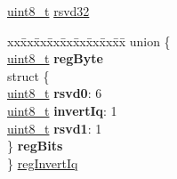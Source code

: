 \begin{DoxyCompactItemize}
\begin{tabbing}
\end{tabbing}\item 
\hyperlink{vl53l0x__types_8h_aba7bc1797add20fe3efdf37ced1182c5}{uint8\+\_\+t} \hyperlink{structFSK__Register__Map_a2afb62dfcde2ff0b44bd883947289d33}{rsvd32}
\item 
\begin{tabbing}
xx\=xx\=xx\=xx\=xx\=xx\=xx\=xx\=xx\=\kill
union \{\\
\>\hyperlink{vl53l0x__types_8h_aba7bc1797add20fe3efdf37ced1182c5}{uint8\_t} {\bfseries regByte}\\
\>struct \{\\
\>\>\hyperlink{vl53l0x__types_8h_aba7bc1797add20fe3efdf37ced1182c5}{uint8\_t} {\bfseries rsvd0}: 6\\
\>\>\hyperlink{vl53l0x__types_8h_aba7bc1797add20fe3efdf37ced1182c5}{uint8\_t} {\bfseries invertIq}: 1\\
\>\>\hyperlink{vl53l0x__types_8h_aba7bc1797add20fe3efdf37ced1182c5}{uint8\_t} {\bfseries rsvd1}: 1\\
\>\} {\bfseries regBits}\\
\} \hyperlink{structFSK__Register__Map_a0d59eab2b1fd415bf69d2ab31c8e3814}{regInvertIq}\\


\end{tabbing}
\end{DoxyCompactItemize}
